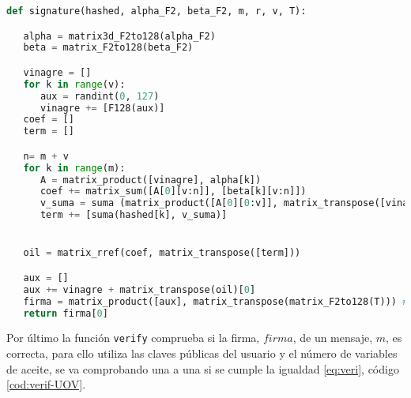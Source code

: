 \vspace{0.25cm}

\begin{lstlisting}[language=Python,caption=Firma del mensaje, label=cod:firma-UOV]
def signature(hashed, alpha_F2, beta_F2, m, r, v, T):

   alpha = matrix3d_F2to128(alpha_F2)
   beta = matrix_F2to128(beta_F2)

   vinagre = []
   for k in range(v):
      aux = randint(0, 127)
      vinagre += [F128(aux)]
   coef = []
   term = []

   n= m + v
   for k in range(m):
      A = matrix_product([vinagre], alpha[k])
      coef += matrix_sum([A[0][v:n]], [beta[k][v:n]])
      v_suma = suma (matrix_product([A[0][0:v]], matrix_transpose([vinagre]))[0][0], matrix_product([beta[k][0:v]], matrix_transpose([vinagre]))[0][0])
      term += [suma(hashed[k], v_suma)]


   oil = matrix_rref(coef, matrix_transpose([term]))

   aux = []
   aux += vinagre + matrix_transpose(oil)[0]
   firma = matrix_product([aux], matrix_transpose(matrix_F2to128(T))) #T = T.inverse()
   return firma[0]
\end{lstlisting}

Por último la función \texttt{verify} comprueba si la firma, $firma$, de un mensaje, $m$, es correcta, para ello utiliza las claves públicas del usuario y el número de variables de aceite, se va comprobando una a una si se cumple la igualdad \ref{eq:veri}, código \ref{cod:verif-UOV}.

